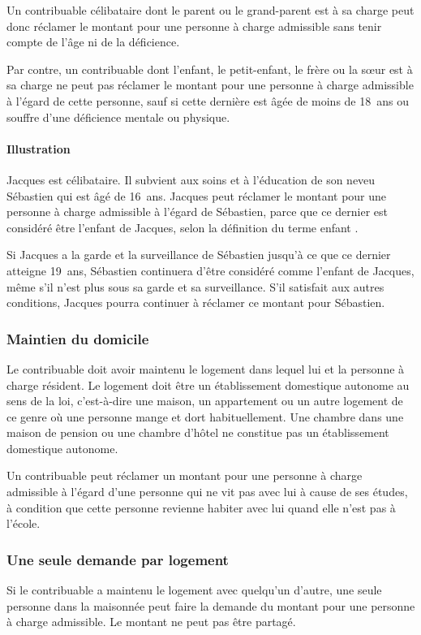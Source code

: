 Un contribuable célibataire dont le parent ou le grand-parent est à sa charge peut donc réclamer le montant pour une personne à charge admissible sans tenir compte de l'âge ni de la déficience. 

Par contre, un contribuable dont l'enfant, le petit-enfant, le frère ou la sœur est à sa charge ne peut pas réclamer le montant pour une personne à charge admissible à l'égard de cette personne, sauf si cette dernière est âgée de moins de 18~ans ou souffre d'une déficience mentale ou physique.

\paragraph{Illustration}
Jacques est célibataire. Il subvient aux soins et à l'éducation de son neveu Sébastien qui est âgé de 16~ans. Jacques peut réclamer le montant pour une personne à charge admissible à l'égard de Sébastien, parce que ce dernier est considéré être l'enfant de Jacques, selon la définition du terme \og enfant \fg{}.

Si Jacques a la garde et la surveillance de Sébastien jusqu'à ce que ce dernier atteigne 19~ans, Sébastien continuera d'être considéré comme l'enfant de Jacques, même s'il n'est plus sous sa garde et sa surveillance. S'il satisfait aux autres conditions, Jacques pourra continuer à réclamer ce montant pour Sébastien.

\subsubsection{Maintien du domicile}
Le contribuable doit avoir maintenu le logement dans lequel lui et la personne à charge résident. Le logement doit être un établissement domestique autonome au sens de la loi, c'est-à-dire une maison, un appartement ou un autre logement de ce genre où une personne mange et dort habituellement. Une chambre dans une maison de pension ou une chambre d'hôtel ne constitue pas un établissement domestique autonome.

Un contribuable peut réclamer un montant pour une personne à charge admissible à l'égard d'une personne qui ne vit pas avec lui à cause de ses études, à condition que cette personne revienne habiter avec lui quand elle n'est pas à l'école.

\subsubsection{Une seule demande par logement}
Si le contribuable a maintenu le logement avec quelqu'un d'autre, une seule personne dans la maisonnée peut faire la demande du montant pour une personne à charge admissible. Le montant ne peut pas être partagé.

